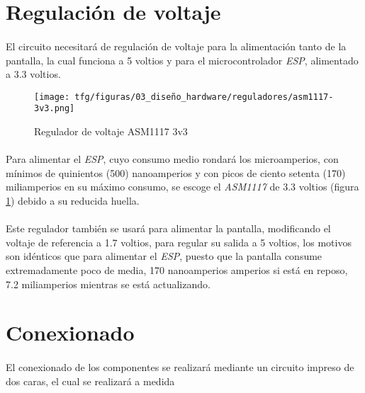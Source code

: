 \section{Regulación de voltaje}

\paragraph{} El circuito necesitará de regulación de voltaje para la alimentación tanto de la pantalla, la cual funciona a 5 voltios y para el microcontrolador \textit{ESP}, alimentado a 3.3 voltios.

\begin{figure}[!htb]
    \centering
    \texttt{[image: tfg/figuras/03\_diseño\_hardware/reguladores/asm1117-3v3.png]}
    \caption{Regulador de voltaje ASM1117 3v3}
    \label{fig:tfg:03:asm1117-3v3}
\end{figure}

\paragraph{} Para alimentar el \textit{ESP}, cuyo consumo medio rondará los microamperios, con mínimos de quinientos (500) nanoamperios y con picos de ciento setenta (170) miliamperios en su máximo consumo, se escoge el \textit{ASM1117} de 3.3 voltios (figura \ref{fig:tfg:03:asm1117-3v3}) debido a su reducida huella.

\paragraph{} Este regulador también se usará para alimentar la pantalla, modificando el voltaje de referencia a 1.7 voltios, para regular su salida a 5 voltios, los motivos son idénticos que para alimentar el \textit{ESP}, puesto que la pantalla consume extremadamente poco de media, 170 nanoamperios amperios si está en reposo, 7.2 miliamperios mientras se está actualizando.

\section{Conexionado}

\paragraph{} El conexionado de los componentes se realizará mediante un circuito impreso de dos caras, el cual se realizará a medida